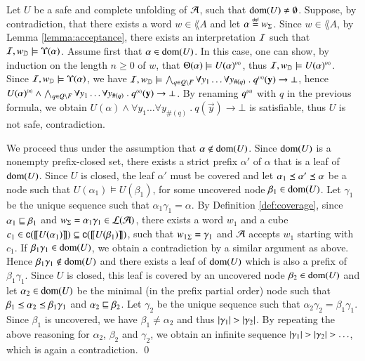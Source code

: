Let $U$ be a safe and complete unfolding of $\mathcal{A}$, such that $\mathrm{dom}(U)
\neq \emptyset$. Suppose, by contradiction, that there exists a word
$w \in \lang{A}$ and let $\alpha \stackrel{\scriptscriptstyle{\mathsf{def}}}{=} {w}_\Sigma$. Since $w \in
\lang{A}$, by Lemma \ref{lemma:acceptance}, there exists an
interpretation $\mathcal{I}$ such that $\mathcal{I},{w}_{\mathbb{D}} \models
\Upsilon({\alpha})$. Assume first that $\alpha \in \mathrm{dom}(U)$.  In this
case, one can show, by induction on the length $n\geq0$ of $w$, that
$\Theta({\alpha}) \models {U(\alpha)}^{\scriptscriptstyle{({n})}}$, thus $\mathcal{I},{w}_{\mathbb{D}}
\models {U(\alpha)}^{\scriptscriptstyle{({n})}}$. Since $\mathcal{I},{w}_{\mathbb{D}} \models
\Upsilon({\alpha})$, we have $\mathcal{I},{w}_{\mathbb{D}} \models \bigwedge_{q \in Q
  \setminus F} \forall y_1 \ldots \forall y_{\#(q)} ~.~
{q}^{\scriptscriptstyle{({n})}}(\mathbf y) \rightarrow \bot$, hence ${U(\alpha)}^{\scriptscriptstyle{({n})}}
\wedge \bigwedge_{q \in Q \setminus F} \forall y_1 \ldots \forall
y_{\#(q)} ~.~ {q}^{\scriptscriptstyle{({n})}}(\mathbf y) \rightarrow \bot$. By renaming
${q}^{\scriptscriptstyle{({n})}}$ with $q$ in the previous formula, we obtain $U(\alpha)
\wedge \forall y_1 \ldots \forall y_{\#(q)} ~.~ q(\vec{y}) \rightarrow
\bot$ is satisfiable, thus $U$ is not safe, contradiction.

We proceed thus under the assumption that $\alpha \not\in
\mathrm{dom}(U)$. Since $\mathrm{dom}(U)$ is a nonempty prefix-closed set, there
exists a strict prefix $\alpha'$ of $\alpha$ that is a leaf of
$\mathrm{dom}(U)$. Since $U$ is closed, the leaf $\alpha'$ must be covered and
let $\alpha_1 \preceq \alpha' \preceq \alpha$ be a node such that
$U(\alpha_1) \models U(\beta_1)$, for some uncovered node $\beta_1 \in
\mathrm{dom}(U)$. Let $\gamma_1$ be the unique sequence such that
$\alpha_1\gamma_1 = \alpha$. By Definition \ref{def:coverage}, since
$\alpha_1 \sqsubseteq \beta_1$ and ${w}_\Sigma = \alpha_1\gamma_1 \in
{\mathcal L}({\mathcal{A}})$, there exists a word $w_1$ and a cube $c_1 \in
\mathsf{c}({{\bf [\![} U(\alpha_1) {\bf ]\!]}}) \subseteq \mathsf{c}({{\bf [\![} U(\beta_1) {\bf ]\!]}})$, such that
${w_1}_\Sigma = \gamma_1$ and $\mathcal{A}$ accepts $w_1$ starting with
$c_1$. If $\beta_1\gamma_1 \in \mathrm{dom}(U)$, we obtain a contradiction by
a similar argument as above. Hence $\beta_1\gamma_1 \not\in \mathrm{dom}(U)$
and there exists a leaf of $\mathrm{dom}(U)$ which is also a prefix of
$\beta_1\gamma_1$. Since $U$ is closed, this leaf is covered by an
uncovered node $\beta_2 \in \mathrm{dom}(U)$ and let $\alpha_2 \in \mathrm{dom}(U)$ be
the minimal (in the prefix partial order) node such that $\beta_1
\preceq \alpha_2 \preceq \beta_1\gamma_1$ and $\alpha_2 \sqsubseteq
\beta_2$. Let $\gamma_2$ be the unique sequence such that
$\alpha_2\gamma_2 = \beta_1\gamma_1$. Since $\beta_1$ is uncovered, we
have $\beta_1 \neq \alpha_2$ and thus ${|{\gamma_1}|} >
{|{\gamma_2}|}$. By repeating the above reasoning for $\alpha_2$,
$\beta_2$ and $\gamma_2$, we obtain an infinite sequence
${|{\gamma_1}|} > {|{\gamma_2}|} > \ldots$, which is again a
contradiction. \qed

